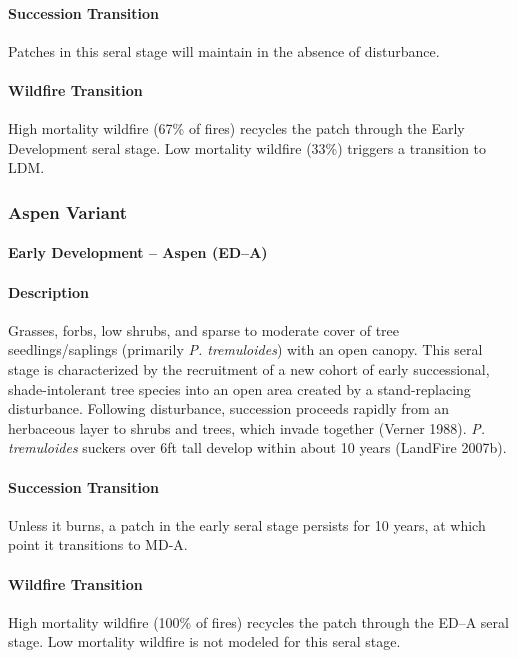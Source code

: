 \paragraph{Succession Transition} Patches in this seral stage will maintain in the absence of disturbance.

\paragraph{Wildfire Transition} High mortality wildfire (67\% of fires) recycles the patch through the Early Development seral stage. Low mortality wildfire (33\%) triggers a transition to LDM. 

\noindent\hrulefill
\noindent\hrulefill

\subsubsection{Aspen Variant}

\paragraph{Early Development – Aspen (ED–A)}

\paragraph{Description} Grasses, forbs, low shrubs, and sparse to moderate cover of tree seedlings/saplings (primarily \emph{P. tremuloides}) with an open canopy. This seral stage is characterized by the recruitment of a new cohort of early successional, shade-intolerant tree species into an open area created by a stand-replacing disturbance. Following disturbance, succession proceeds rapidly from an herbaceous layer to shrubs and trees, which invade together (Verner 1988). \emph{P. tremuloides} suckers over 6ft tall develop within about 10 years (LandFire 2007b). 


\paragraph{Succession Transition} Unless it burns, a patch in the early seral stage persists for 10 years, at which point it transitions to MD-A.

\paragraph{Wildfire Transition} High mortality wildfire (100\% of fires) recycles the patch through the ED–A seral stage. Low mortality wildfire is not modeled for this seral stage.

